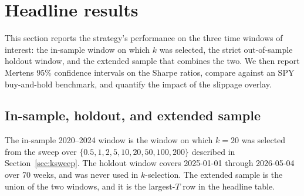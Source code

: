 \documentclass[11pt]{article}
\theoremstyle{definition}
\theoremstyle{remark}
\begin{document}
\section{Headline results}\label{sec:results}

This section reports the strategy's performance on the three time
windows of interest: the in-sample window on which $k$ was
selected, the strict out-of-sample holdout window, and the
extended sample that combines the two. We then report Mertens 95\%
confidence intervals on the Sharpe ratios, compare against an SPY
buy-and-hold benchmark, and quantify the impact of the slippage
overlay.

\subsection{In-sample, holdout, and extended sample}

The in-sample 2020--2024 window is the window on which $k = 20$
was selected from the sweep over $\{0.5, 1, 2, 5, 10, 20, 50,
100, 200\}$ described in Section~\ref{sec:ksweep}. The holdout
window covers 2025-01-01 through 2026-05-04 over 70 weeks, and was
never used in $k$-selection. The extended sample is the union of
the two windows, and it is the largest-$T$ row in the headline
table.
\end{document}
